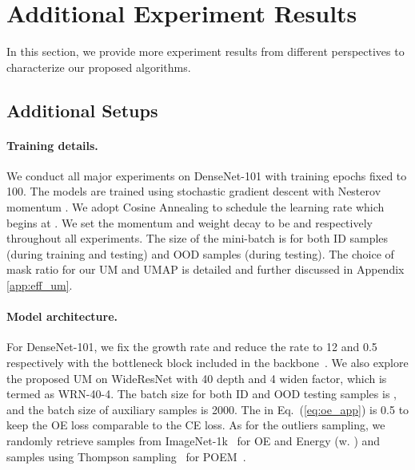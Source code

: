 \documentclass{article}
\theoremstyle{plain}
\theoremstyle{definition}
\theoremstyle{remark}
\begin{document}
\clearpage

\section{Additional Experiment Results}
\label{app:additional_exp_results}

In this section, we provide more experiment results from different perspectives to characterize our proposed algorithms. 



\subsection{Additional Setups}
\label{app:additional_exp_setup}


\paragraph{Training details.} We conduct all major experiments on DenseNet-101 \citep{huang2017densely} with training epochs fixed to 100. The models are trained using stochastic gradient descent \citep{1177729392} with Nesterov momentum \citep{JMLR:v12:duchi11a}. We adopt Cosine Annealing \citep{LoshchilovH17} to schedule the learning rate which begins at . We set the momentum and weight decay to be  and  respectively throughout all experiments. The size of the mini-batch is  for both ID samples (during training and testing) and OOD samples (during testing). The choice of mask ratio for our UM and UMAP is detailed and further discussed in Appendix \ref{app:eff_um}.

\paragraph{Model architecture.} For DenseNet-101, we fix the growth rate and reduce the rate to 12 and 0.5 respectively with the bottleneck block included in the backbone~\citep{ming2022poem}. We also explore the proposed UM on WideResNet \citep{zagoruyko2016wide} with 40 depth and 4 widen factor, which is termed as WRN-40-4. The batch size for both ID and OOD testing samples is , and the batch size of auxiliary samples is 2000. The  in Eq.~(\ref{eq:oe_app}) is 0.5 to keep the OE loss comparable to the CE loss. As for the outliers sampling, we randomly retrieve  samples from ImageNet-1k~\citep{deng2009imagenet} for OE and Energy (w. ) and  samples using Thompson sampling~\citep{thompson} for POEM~\citep{ming2022poem}.
\end{document}
